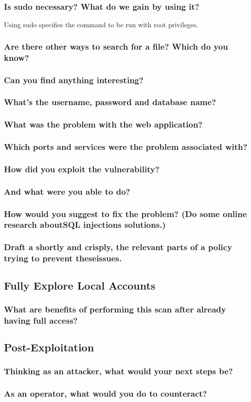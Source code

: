 \subsubsection*{Is sudo necessary? What do we gain by using it?}
Using sudo specifies the command to be run with root privileges.
\subsubsection*{Are there other ways to search for a file? Which do you know?}

\subsubsection*{Can you find anything interesting?}
\subsubsection*{What's the username, password and database name?}
\subsubsection*{What was the problem with the web application?}
\subsubsection*{Which ports and services were the problem associated with?}
\subsubsection*{How did you exploit the vulnerability?}
\subsubsection*{And what were you able to do?}
\subsubsection*{How would you suggest to fix the problem? (Do some online research aboutSQL injections solutions.)}
\subsubsection*{Draft a shortly and crisply, the relevant parts of a policy trying to prevent theseissues.}

\subsection*{Fully Explore Local Accounts}
\subsubsection*{What are benefits of performing this scan after already having full access?}

\subsection*{Post-Exploitation}
\subsubsection*{Thinking as an attacker, what would your next steps be?}
\subsubsection*{As an operator, what would you do to counteract?}